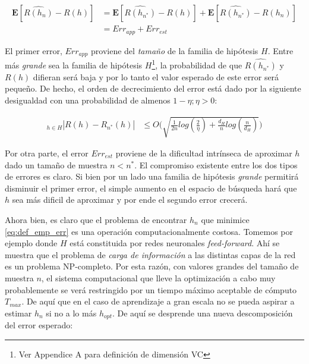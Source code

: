 \documentclass{book}
\theoremstyle{plain}
\theoremstyle{definition}
\theoremstyle{remark}
\begin{document}
\begin{equation*}
  \begin{split}
    \mathbf{E}[\hat{R(h_{n})} - R(h)] & = \mathbf{E}[\hat{R(h_{n^{*}})} - R(h)] + \mathbf{E}[\hat{R(h_{n^{*}})} - R(h_n)]\\
                                     & = Err_{app} + Err_{est}
  \end{split}
\end{equation*}

El primer error, $Err_{app}$ proviene del \emph{tamaño} de la familia de hipótesis $H$. Entre más \emph{grande} sea la familia de hipótesis $H$\footnote{Ver Appendice A para definición de dimensión VC}, la probabilidad de que $\hat{R(h_{n^{*}})}$ y $R(h)$ difieran será baja y por lo tanto el valor esperado de este error será pequeño. De hecho, el orden de decrecimiento del error  está dado por la siguiente desigualdad\cite{VAPNIK2} con una probabilidad de almenos $1-\eta;\eta >0$:

\begin{equation*}
  \begin{split}
    \displaystyle_{h \in H} |R(h) - R_{n^{*}}(h)| & \leq O\bigg( \sqrt{\frac{1}{2n}log(\frac{2}{\eta}) + \frac{d_H}{n}log(\frac{n}{d_H})}\bigg)
  \end{split}
\end{equation*}


Por otra parte, el error $Err_{est}$ proviene de la dificultad intrínseca de aproximar $h$ dado un tamaño de muestra $n<n^{*}$. El compromiso existente entre los dos tipos de errores es claro. Si bien por un lado una familia de hipótesis \emph{grande} permitirá disminuir el primer error, el simple aumento en el espacio de búsqueda hará que $h$ sea más dificil de aproximar y por ende el segundo error crecerá.

Ahora bien, es claro que el problema de encontrar $h_n$ que minimice \ref{eq:def_emp_err} es una operación computacionalmente costosa. Tomemos por ejemplo\cite{JUDD} donde $H$ está constituida por redes neuronales \emph{feed-forward}. Ahí se muestra que el problema de \emph{carga de información} a las distintas capas de la red es un problema NP-completo. Por esta razón, con valores grandes del tamaño de muestra $n$, el sistema computacional que lleve la optimización a cabo muy probablemente se verá restringido por un tiempo máximo aceptable de cómputo $T_{max}$. De aquí que en el caso de aprendizaje a gran escala no se pueda aspirar a estimar $h_n$ si no a lo más $h_{opt}$. De aquí se desprende una nueva descomposición del error esperado:
\end{document}
